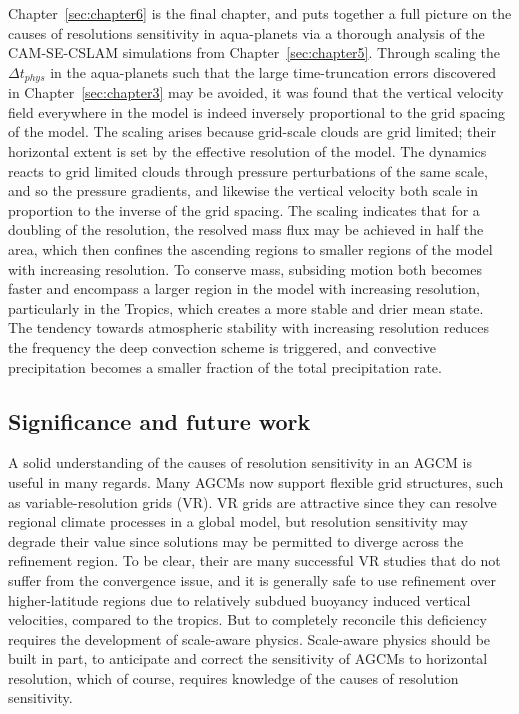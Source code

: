 Chapter~\ref{sec:chapter6} is the final chapter, and puts together a full picture on the causes of resolutions sensitivity in aqua-planets via a thorough analysis of the CAM-SE-CSLAM simulations from Chapter~\ref{sec:chapter5}. Through scaling the $\Delta t_{phys}$ in the aqua-planets such that the large time-truncation errors discovered in Chapter~\ref{sec:chapter3} may be avoided, it was found that the vertical velocity field everywhere in the model is indeed inversely proportional to the grid spacing of the model. The scaling arises because grid-scale clouds are grid limited; their horizontal extent is set by the effective resolution of the model. The dynamics reacts to grid limited clouds through pressure perturbations of the same scale, and so the pressure gradients, and likewise the vertical velocity both scale in proportion to the inverse of the grid spacing. The scaling indicates that for a doubling of the resolution, the resolved mass flux may be achieved in half the area, which then confines the ascending regions to smaller regions of the model with increasing resolution. To conserve mass, subsiding motion both becomes faster and encompass a larger region in the model with increasing resolution, particularly in the Tropics, which creates a more stable and drier mean state. The tendency towards atmospheric stability with increasing resolution reduces the frequency the deep convection scheme is triggered, and convective precipitation becomes a smaller fraction of the total precipitation rate.

\subsection{Significance and future work}

A solid understanding of the causes of resolution sensitivity in an AGCM is useful in many regards. Many AGCMs now support flexible grid structures, such as variable-resolution grids (VR). VR grids are attractive since they can resolve regional climate processes in a global model, but resolution sensitivity may degrade their value since solutions may be permitted to diverge across the refinement region. To be clear, their are many successful VR studies that do not suffer from the convergence issue, and it is generally safe to use refinement over higher-latitude regions due to relatively subdued buoyancy induced vertical velocities, compared to the tropics. But to completely reconcile this deficiency requires the development of scale-aware physics. Scale-aware physics should be built in part, to anticipate and correct the sensitivity of AGCMs to horizontal resolution, which of course, requires knowledge of the causes of resolution sensitivity.

